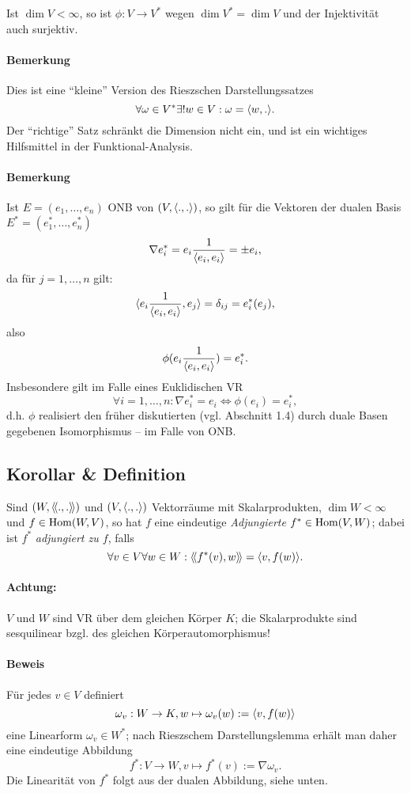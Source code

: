 	Ist $ \dim V <\infty $, so ist $ \phi:V\to V^* $ wegen $ \dim V^* = \dim V $ und der Injektivität auch surjektiv.
\paragraph{Bemerkung}
	Dies ist eine "`kleine"' Version des Rieszschen Darstellungssatzes
	\[ \forall \omega\in V^*\exists! w\in V: \omega = \langle w,. \rangle. \]
	Der "`richtige"' Satz schränkt die Dimension nicht ein, und ist ein wichtiges Hilfsmittel in der Funktional-Analysis.
\paragraph{Bemerkung}
	Ist $ E = (e_1,\dots,e_n) $ ONB von $ (V,\langle .,. \rangle) $, so gilt für die Vektoren der dualen Basis $ E^* = (e_1^*,\dots,e_n^*) $
		\[ \nabla e_i^* = e_i\frac{1}{\langle e_i,e_i \rangle} = \pm e_i, \]
	da für $ j=1,\dots,n $ gilt:
		\[ \langle e_i\frac{1}{\langle e_i,e_i \rangle},e_j \rangle = \delta_{ij} = e_i^*(e_j), \]
	also
		\[ \phi(e_i\frac{1}{\langle e_i,e_i \rangle}) = e_i^*. \]
	Insbesondere gilt im Falle eines Euklidischen VR
		\[ \forall i=1,\dots,n: \nabla e_i^* = e_i \Leftrightarrow \phi(e_i)= e_i^*, \]
	d.h. $ \phi $ realisiert den früher diskutierten (vgl. Abschnitt 1.4) durch duale Basen gegebenen
	Isomorphismus -- im Falle von ONB.

\subsection{Korollar \& Definition}
\begin{Definition}[Adjungierte]
	Sind $ (W,\langle\! \langle .,. \rangle\! \rangle) $ und $ (V,\langle .,. \rangle) $ Vektorräume mit Skalarprodukten, $ \dim W < \infty $ und $ f\in \operatorname{Hom}(W,V) $, so hat $ f $ eine eindeutige \emph{Adjungierte} $ f^* \in \operatorname{Hom}(V,W) $;
	dabei ist $ f^* $ \emph{adjungiert zu $ f $}, falls
		\[ \forall v\in V\forall w\in W: \langle\! \langle f^*(v),w \rangle\! \rangle = \langle v,f(w) \rangle. \]
\end{Definition}
\paragraph{Achtung:}
$ V $ und $ W $ sind VR über dem gleichen Körper $ K $; die Skalarprodukte sind sesquilinear bzgl. des gleichen Körperautomorphismus!
\paragraph{Beweis}
	Für jedes $ v\in V $ definiert
		\[ \omega_v:W\to K, w\mapsto \omega_v(w) := \langle v,f(w) \rangle \]
	eine Linearform $ \omega_v\in W^* $; nach Rieszschem Darstellungslemma erhält man daher eine eindeutige Abbildung 
		\[ f^*:V\to W, v\mapsto f^*(v):= \nabla \omega_v. \]
	Die Linearität von $ f^* $ folgt aus der dualen Abbildung, siehe unten.
